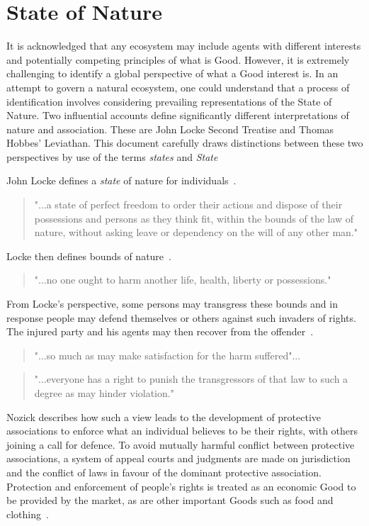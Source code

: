 \documentclass[11pt, oneside]{book}   	%
\begin{document}
\section{State of Nature}
It is acknowledged that any ecosystem may include agents with different interests and potentially competing principles of what is Good.
However, it is extremely challenging to identify a global perspective of what a Good interest is.
In an attempt to govern a natural ecosystem, one could understand that a process of identification involves considering prevailing representations of the State of Nature.
Two influential accounts define significantly different interpretations of nature and association.
These are John Locke Second Treatise and Thomas Hobbes' Leviathan.
This document carefully draws distinctions between these two perspectives by use of the terms \emph{states} and \emph{State}\

John Locke defines a \emph{state} of nature for individuals~\cite{jl1}.

\begin{quote}
"...a state of perfect freedom to order their actions and dispose of their possessions and persons as they think fit, within the bounds of the law of nature, without asking leave or dependency on the will of any other man."
\end{quote}

Locke then defines bounds of nature~\cite{jl1}.

\begin{quote}
"...no one ought to harm another life, health, liberty or possessions."
\end{quote}

From Locke's perspective, some persons may transgress these bounds and in response people may defend themselves or others against such invaders of rights.
The injured party and his agents may then recover from the offender~\cite{jl1}.

\begin{quote}
"...so much as may make satisfaction for the harm suffered"...
\end{quote}
\begin{quote}
"...everyone has a right to punish the transgressors of that law to such a degree as may hinder violation."
\end{quote}

Nozick describes how such a view leads to the development of protective associations to enforce what an individual believes to be their rights, with others joining a call for defence.
To avoid mutually harmful conflict between protective associations, a system of appeal courts and judgments are made on jurisdiction and the conflict of laws in favour of the dominant protective association.
Protection and enforcement of people's rights is treated as an economic Good to be provided by the market, as are other important Goods such as food and clothing~\cite{rn1}.\
\end{document}
